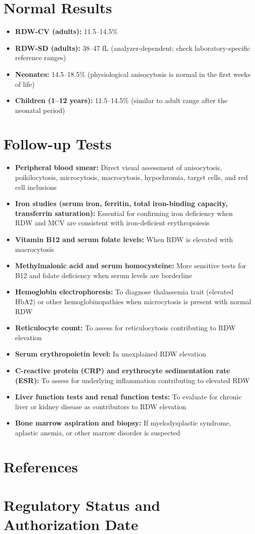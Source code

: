 \section*{Normal Results}
\begin{itemize}
  \item \textbf{RDW-CV (adults):} 11.5--14.5\% \cite{fischbach2023manual}
  \item \textbf{RDW-SD (adults):} 38--47 fL (analyzer-dependent; check laboratory-specific reference ranges)
  \item \textbf{Neonates:} 14.5--18.5\% (physiological anisocytosis is normal in the first weeks of life)
  \item \textbf{Children (1--12 years):} 11.5--14.5\% (similar to adult range after the neonatal period)
\end{itemize}

\section*{Follow-up Tests}
\begin{itemize}
  \item \textbf{Peripheral blood smear:} Direct visual assessment of anisocytosis, poikilocytosis, microcytosis, macrocytosis, hypochromia, target cells, and red cell inclusions
  \item \textbf{Iron studies (serum iron, ferritin, total iron-binding capacity, transferrin saturation):} Essential for confirming iron deficiency when RDW and MCV are consistent with iron-deficient erythropoiesis
  \item \textbf{Vitamin B12 and serum folate levels:} When RDW is elevated with macrocytosis
  \item \textbf{Methylmalonic acid and serum homocysteine:} More sensitive tests for B12 and folate deficiency when serum levels are borderline
  \item \textbf{Hemoglobin electrophoresis:} To diagnose thalassemia trait (elevated HbA2) or other hemoglobinopathies when microcytosis is present with normal RDW
  \item \textbf{Reticulocyte count:} To assess for reticulocytosis contributing to RDW elevation
  \item \textbf{Serum erythropoietin level:} In unexplained RDW elevation
  \item \textbf{C-reactive protein (CRP) and erythrocyte sedimentation rate (ESR):} To assess for underlying inflammation contributing to elevated RDW
  \item \textbf{Liver function tests and renal function tests:} To evaluate for chronic liver or kidney disease as contributors to RDW elevation
  \item \textbf{Bone marrow aspiration and biopsy:} If myelodysplastic syndrome, aplastic anemia, or other marrow disorder is suspected
\end{itemize}

\section*{References}



\clearpage
\section*{Regulatory Status and Authorization Date}

\clearpage

